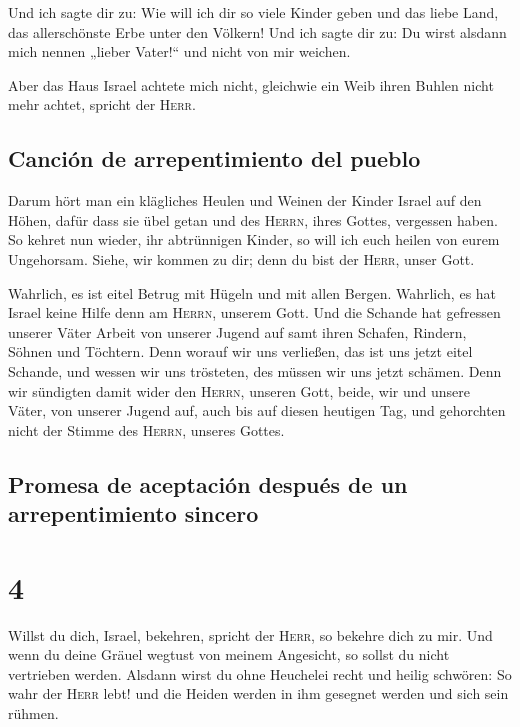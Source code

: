  Und ich sagte dir zu: Wie will ich dir so viele Kinder
geben und das liebe Land, das allerschönste Erbe unter den Völkern! Und
ich sagte dir zu: Du wirst alsdann mich nennen „lieber Vater!{}`` und
nicht von mir weichen.

 Aber das Haus Israel achtete mich nicht, gleichwie ein
Weib ihren Buhlen nicht mehr achtet, spricht der \textsc{Herr}.

\hypertarget{canciuxf3n-de-arrepentimiento-del-pueblo}{%
\subsection{Canción de arrepentimiento del
pueblo}\label{canciuxf3n-de-arrepentimiento-del-pueblo}}

 Darum hört man ein klägliches Heulen und Weinen der
Kinder Israel auf den Höhen, dafür dass sie übel getan und des
\textsc{Herrn}, ihres Gottes, vergessen haben.  So kehret
nun wieder, ihr abtrünnigen Kinder, so will ich euch heilen von eurem
Ungehorsam. Siehe, wir kommen zu dir; denn du bist der \textsc{Herr},
unser Gott.

 Wahrlich, es ist eitel Betrug mit Hügeln und mit allen
Bergen. Wahrlich, es hat Israel keine Hilfe denn am \textsc{Herrn},
unserem Gott.  Und die Schande hat gefressen unserer
Väter Arbeit von unserer Jugend auf samt ihren Schafen, Rindern, Söhnen
und Töchtern.  Denn worauf wir uns verließen, das ist uns
jetzt eitel Schande, und wessen wir uns trösteten, des müssen wir uns
jetzt schämen. Denn wir sündigten damit wider den \textsc{Herrn},
unseren Gott, beide, wir und unsere Väter, von unserer Jugend auf, auch
bis auf diesen heutigen Tag, und gehorchten nicht der Stimme des
\textsc{Herrn}, unseres Gottes.

\hypertarget{promesa-de-aceptaciuxf3n-despuuxe9s-de-un-arrepentimiento-sincero}{%
\subsection{Promesa de aceptación después de un arrepentimiento
sincero}\label{promesa-de-aceptaciuxf3n-despuuxe9s-de-un-arrepentimiento-sincero}}

\hypertarget{section-3}{%
\section{4}\label{section-3}}

 Willst du dich, Israel, bekehren, spricht der
\textsc{Herr}, so bekehre dich zu mir. Und wenn du deine Gräuel wegtust
von meinem Angesicht, so sollst du nicht vertrieben werden.
 Alsdann wirst du ohne Heuchelei recht und heilig
schwören: So wahr der \textsc{Herr} lebt! und die Heiden werden in ihm
gesegnet werden und sich sein rühmen.


